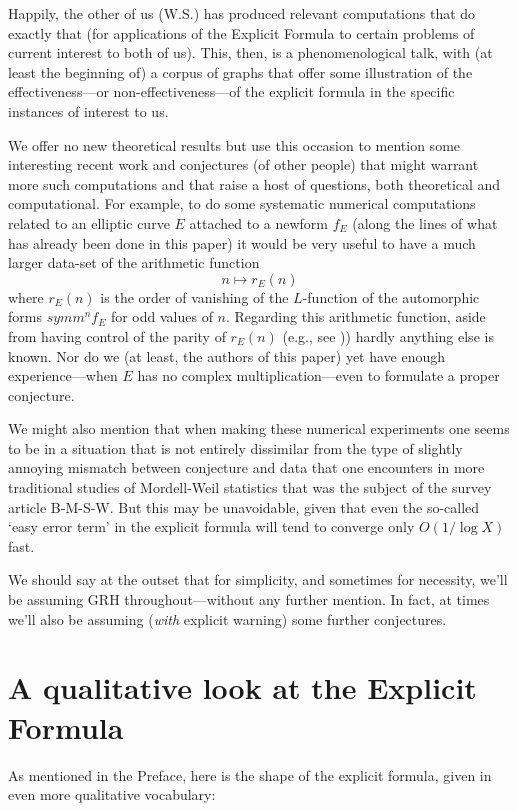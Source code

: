\documentclass[11pt]{article}
\theoremstyle{plain}
\theoremstyle{definition}
\numberwithin{equation}{section}
\numberwithin{figure}{section}
\numberwithin{table}{section}
\begin{document}
 Happily, the other of us (W.S.) has produced relevant computations that do exactly that (for applications of the Explicit Formula to certain problems of current interest to both of us). This, then, is a phenomenological talk, with (at least the beginning of)  a corpus  of graphs that offer some  illustration of the effectiveness---or non-effectiveness---of the explicit formula in the specific instances of interest to us.

 We offer no new theoretical results but use this occasion to mention some interesting recent work and conjectures  (of other people)  that might warrant more such computations and that raise a host of questions, both theoretical and computational.   For example, to do some systematic numerical computations related to an elliptic curve $E$ attached to a newform $f_E$  (along the lines of what has already been done in this paper)  it would be very useful to have a much larger data-set  of the arithmetic function  $$n \mapsto r_E(n)$$
 where $r_E(n)$ is the order of vanishing of the $L$-function of the automorphic forms $symm^nf_E$ for odd values of $n$.  Regarding this arithmetic function, aside from having control of the parity of   $r_E(n)$  (e.g., see \cite{DMW}))  hardly anything else is known. Nor do we (at least, the authors of this paper)  yet have enough experience---when $E$ has no complex multiplication---even to formulate a proper conjecture.

 We might also mention that when making these numerical experiments one seems to be in a situation  that is not entirely dissimilar from the type of slightly annoying mismatch between conjecture and data that one encounters in more traditional studies of Mordell-Weil statistics  that was the subject of the survey article B-M-S-W.  But this may be unavoidable, given that even  the so-called  `easy error term' in the explicit formula will tend to converge  only $O(1/\log X)$ fast.

 We should say at the outset that for simplicity, and sometimes for necessity, we'll be assuming GRH throughout---without any further mention. In fact, at times we'll also be assuming ({\it with} explicit warning) some further conjectures.


 \section{A qualitative look at the Explicit Formula}
 As mentioned in the Preface, here is the shape of the explicit formula, given in even more qualitative vocabulary:
\end{document}
